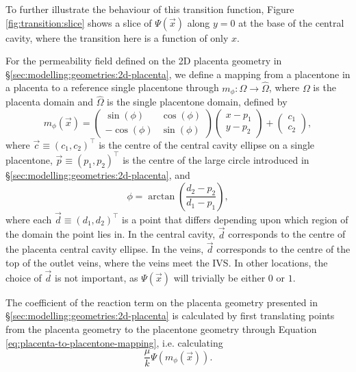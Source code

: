     To further illustrate the behaviour of this transition function, Figure \ref{fig:transition:slice} shows a slice of $\Psi(\vec{x})$ along $y = 0$ at the base of the central cavity, where the transition here is a function of only $x$.

    For the permeability field defined on the 2D placenta geometry in \S\ref{sec:modelling:geometries:2d-placenta}, we define a mapping from a placentone in a placenta to a reference single placentone through $m_{\phi}: \Omega \rightarrow \hat{\Omega}$, where $\Omega$ is the placenta domain and $\hat{\Omega}$ is the single placentone domain, defined by
    \begin{equation}
        m_{\phi}(\vec{x}) =
        \begin{pmatrix}
                \sin (\phi) & \cos (\phi) \\
            -\cos (\phi) & \sin (\phi) 
        \end{pmatrix}
        \begin{pmatrix}
            x - p_1 \\
            y - p_2
        \end{pmatrix} + 
        \begin{pmatrix}
            c_1 \\
            c_2
        \end{pmatrix},
        \label{eq:placenta-to-placentone-mapping}
    \end{equation}
    where $\vec{c} \equiv (c_1, c_2)^\intercal$ is the centre of the central cavity ellipse on a single placentone, $\vec{p} \equiv (p_1, p_2)^\intercal$ is the centre of the large circle introduced in \S\ref{sec:modelling:geometries:2d-placenta}, and
    \begin{equation}
        \phi = \arctan \left( \frac{d_2 - p_2}{d_1 - p_1} \right),
    \end{equation}
    where each $\vec{d} \equiv (d_1, d_2)^\intercal$ is a point that differs depending upon which region of the domain the point lies in. In the central cavity, $\vec{d}$ corresponds to the centre of the placenta central cavity ellipse. In the veins, $\vec{d}$ corresponds to the centre of the top of the outlet veins, where the veins meet the IVS. In other locations, the choice of $\vec{d}$ is not important, as $\Psi(\vec{x})$ will trivially be either $0$ or $1$.
    
    The coefficient of the reaction term on the placenta geometry presented in \S\ref{sec:modelling:geometries:2d-placenta} is calculated by first translating points from the placenta geometry to the placentone geometry through Equation \eqref{eq:placenta-to-placentone-mapping}, i.e. calculating
    \begin{equation}
        \frac{\mu}{k} \Psi(m_\phi(\vec{x})).
    \end{equation}